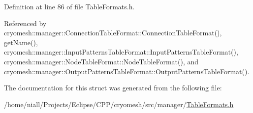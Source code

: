 \-Definition at line 86 of file \-Table\-Formats.\-h.



\-Referenced by cryomesh\-::manager\-::\-Connection\-Table\-Format\-::\-Connection\-Table\-Format(), get\-Name(), cryomesh\-::manager\-::\-Input\-Patterns\-Table\-Format\-::\-Input\-Patterns\-Table\-Format(), cryomesh\-::manager\-::\-Node\-Table\-Format\-::\-Node\-Table\-Format(), and cryomesh\-::manager\-::\-Output\-Patterns\-Table\-Format\-::\-Output\-Patterns\-Table\-Format().



\-The documentation for this struct was generated from the following file\-:\begin{DoxyCompactItemize}
\item 
/home/niall/\-Projects/\-Eclipse/\-C\-P\-P/cryomesh/src/manager/\hyperlink{TableFormats_8h}{\-Table\-Formats.\-h}\end{DoxyCompactItemize}
